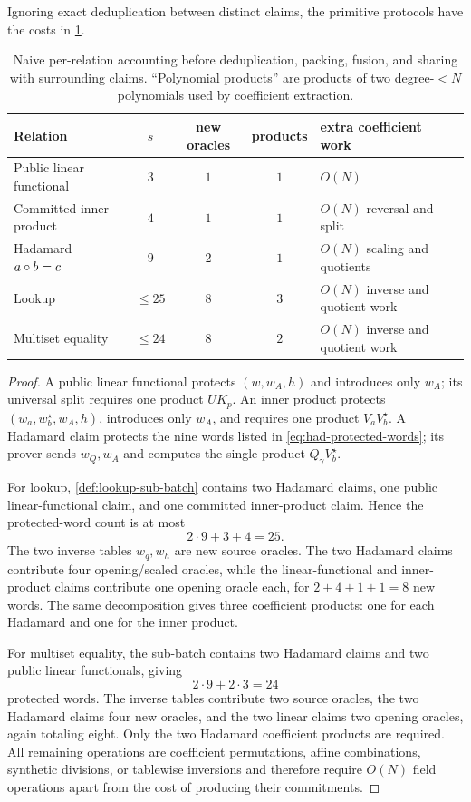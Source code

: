 \begin{proposition}
\label{prop:primitive-word-counts}
Ignoring exact deduplication between distinct claims, the primitive protocols have the costs in \cref{tab:primitive-costs}.
\end{proposition}

\begin{table}[ht]
\centering
\small
\begin{tabular}{@{}p{3.1cm}ccc p{4.2cm}@{}}
\toprule
Relation & $s$ & new oracles & products & extra coefficient work \\
\midrule
Public linear functional & $3$ & $1$ & $1$ & $O(N)$ \\
Committed inner product & $4$ & $1$ & $1$ & $O(N)$ reversal and split \\
Hadamard $a\circ b=c$ & $9$ & $2$ & $1$ & $O(N)$ scaling and quotients \\
Lookup & $\le25$ & $8$ & $3$ & $O(N)$ inverse and quotient work \\
Multiset equality & $\le24$ & $8$ & $2$ & $O(N)$ inverse and quotient work \\
\bottomrule
\end{tabular}
\caption{Naive per-relation accounting before deduplication, packing, fusion, and sharing with surrounding claims.  ``Polynomial products'' are products of two degree-$<N$ polynomials used by coefficient extraction.}
\label{tab:primitive-costs}
\end{table}

\begin{proof}
A public linear functional protects $(w,w_A,h)$ and introduces only $w_A$; its universal split requires one product $UK_p$.  An inner product protects $(w_a,w_b^\star,w_A,h)$, introduces only $w_A$, and requires one product $V_aV_b^\star$.  A Hadamard claim protects the nine words listed in \eqref{eq:had-protected-words}; its prover sends $w_Q,w_A$ and computes the single product $Q_\gamma V_b^\star$.

For lookup, \cref{def:lookup-sub-batch} contains two Hadamard claims, one public linear-functional claim, and one committed inner-product claim.  Hence the protected-word count is at most
\[
  2\cdot9+3+4=25.
\]
The two inverse tables $w_q,w_h$ are new source oracles.  The two Hadamard claims contribute four opening/scaled oracles, while the linear-functional and inner-product claims contribute one opening oracle each, for $2+4+1+1=8$ new words.  The same decomposition gives three coefficient products: one for each Hadamard and one for the inner product.

For multiset equality, the sub-batch contains two Hadamard claims and two public linear functionals, giving
\[
  2\cdot9+2\cdot3=24
\]
protected words.  The inverse tables contribute two source oracles, the two Hadamard claims four new oracles, and the two linear claims two opening oracles, again totaling eight.  Only the two Hadamard coefficient products are required.  All remaining operations are coefficient permutations, affine combinations, synthetic divisions, or tablewise inversions and therefore require $O(N)$ field operations apart from the cost of producing their commitments.
\end{proof}

